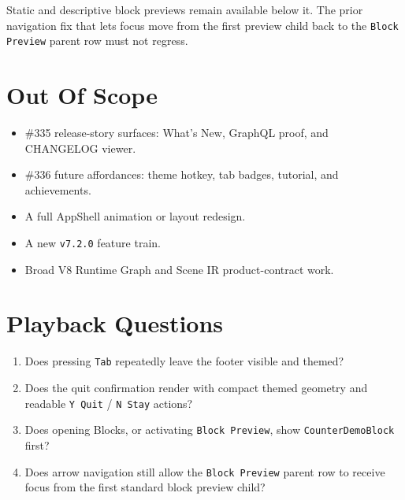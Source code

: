 Static and descriptive block previews remain available below it. The prior navigation fix that lets focus move from the first preview child back to the \texttt{B\allowbreak{}l\allowbreak{}o\allowbreak{}c\allowbreak{}k\allowbreak{} \allowbreak{}P\allowbreak{}r\allowbreak{}e\allowbreak{}v\allowbreak{}i\allowbreak{}e\allowbreak{}w} parent row must not regress.

\section{Out Of Scope}\label{record-115-out-of-scope}

\begin{itemize}
\tightlist
\item
  \#335 release-story surfaces: What's New, GraphQL proof, and CHANGELOG viewer.
\item
  \#336 future affordances: theme hotkey, tab badges, tutorial, and achievements.
\item
  A full AppShell animation or layout redesign.
\item
  A new \texttt{v\allowbreak{}7\allowbreak{}.\allowbreak{}2\allowbreak{}.\allowbreak{}0} feature train.
\item
  Broad V8 Runtime Graph and Scene IR product-contract work.
\end{itemize}

\section{Playback Questions}\label{record-115-playback-questions}

\begin{enumerate}
\def\labelenumi{\arabic{enumi}.}
\tightlist
\item
  Does pressing \texttt{T\allowbreak{}a\allowbreak{}b} repeatedly leave the footer visible and themed?
\item
  Does the quit confirmation render with compact themed geometry and readable \texttt{Y\allowbreak{} \allowbreak{}Q\allowbreak{}u\allowbreak{}i\allowbreak{}t} / \texttt{N\allowbreak{} \allowbreak{}S\allowbreak{}t\allowbreak{}a\allowbreak{}y} actions?
\item
  Does opening Blocks, or activating \texttt{B\allowbreak{}l\allowbreak{}o\allowbreak{}c\allowbreak{}k\allowbreak{} \allowbreak{}P\allowbreak{}r\allowbreak{}e\allowbreak{}v\allowbreak{}i\allowbreak{}e\allowbreak{}w}, show \texttt{C\allowbreak{}o\allowbreak{}u\allowbreak{}n\allowbreak{}t\allowbreak{}e\allowbreak{}r\allowbreak{}D\allowbreak{}e\allowbreak{}m\allowbreak{}o\allowbreak{}B\allowbreak{}l\allowbreak{}o\allowbreak{}c\allowbreak{}k} first?
\item
  Does arrow navigation still allow the \texttt{B\allowbreak{}l\allowbreak{}o\allowbreak{}c\allowbreak{}k\allowbreak{} \allowbreak{}P\allowbreak{}r\allowbreak{}e\allowbreak{}v\allowbreak{}i\allowbreak{}e\allowbreak{}w} parent row to receive focus from the first standard block preview child?
\end{enumerate}

